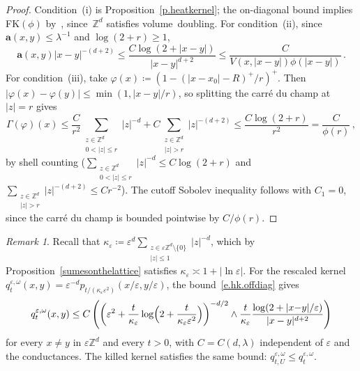 \documentclass[11pt]{amsart}
\theoremstyle{plain}
\theoremstyle{definition}
\theoremstyle{remark}
\newtheorem{remark}[theorem]{Remark}
\newcommand{\Zd}{\mathbb{Z}^d}
\renewcommand{\a}{\mathbf{a}}
\newcommand{\eps}{\varepsilon}
\begin{document}
\begin{proof}
		Condition~\textup{(i)} is Proposition~\ref{p.heatkernel}; the on-diagonal bound implies FK$(\phi)$ by~\cite[Proposition~2.1]{ChenKumagaiWang2019}, since~$\Zd$ satisfies volume~doubling.
		For condition~\textup{(ii)}, since $\a(x,y) \le \lambda^{-1}$ and $\log(2{+}r) \ge 1$,
		\[
		\a(x,y)|x{-}y|^{-(d+2)} \le \frac{C\log(2{+}|x-y|)}{|x-y|^{d+2}} \le \frac{C}{V(x,|x-y|)\phi(|x-y|)}\,.
		\]
		For condition~\textup{(iii)}, take $\varphi(x) \coloneqq (1 - (|x - x_0| - R)^+/r)^+$.
		Then $|\varphi(x) - \varphi(y)| \le \min(1, |x{-}y|/r)$, so splitting the carr\'e du champ at $|z| = r$ gives
		\[
		\Gamma(\varphi)(x) \le \frac{C}{r^2}\sum_{\substack{z \in \Zd \\ 0 < |z| \le r}}|z|^{-d} + C\sum_{\substack{z \in \Zd \\ |z| > r}}|z|^{-(d+2)} \le \frac{C\log(2{+}r)}{r^2} = \frac{C}{\phi(r)}\,,
		\]
		by shell counting ($\sum_{\substack{z \in \Zd \\ 0 < |z| \le r}}|z|^{-d} \le C\log(2{+}r)$ and $\sum_{\substack{z \in \Zd \\ |z| > r}}|z|^{-(d+2)} \le Cr^{-2}$).
		The cutoff Sobolev inequality follows with $C_1 = 0$, since the carr\'e du champ is bounded pointwise by $C/\phi(r)$.
	\end{proof}
	
	\begin{remark}
		Recall that $\kappa_\eps \coloneqq \eps^d\sum_{\substack{z \in \eps\Zd \setminus \{0\} \\ |z| \le 1}}|z|^{-d}$, which by Proposition~\ref{sumesonthelattice} satisfies $\kappa_\eps \asymp 1 + |\ln\eps|$.
		For the rescaled kernel $q_t^{\eps,\omega}(x,y) = \eps^{-d}p_{t/(\kappa_\eps\eps^2)}(x/\eps, y/\eps)$, the bound~\eqref{e.hk.offdiag} gives
		\begin{equation}
			\label{e.hk.offdiag.rescaled}
			q_t^{\eps,\omega}(x,y) \le C\left(\left(\eps^2 + \frac{t}{\kappa_\eps}\log\Bigl(2 + \frac{t}{\kappa_\eps\eps^2}\Bigr)\right)^{-d/2} \wedge \frac{t}{\kappa_\eps}\frac{\log(2 + |x{-}y|/\eps)}{|x-y|^{d+2}}\right)
		\end{equation}
		for every $x \ne y$ in $\eps\Zd$ and every $t > 0$, with $C = C(d,\lambda)$ independent of $\eps$ and the conductances.
		The killed kernel satisfies the same bound: $q_{t,U}^{\eps,\omega} \le q_t^{\eps,\omega}$.
	\end{remark}
	
	
	
\end{document}
